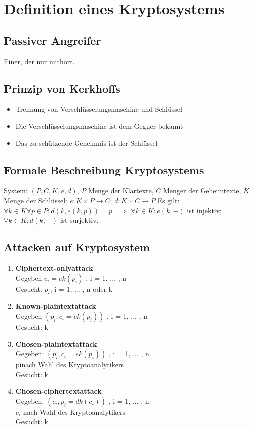 \documentclass[landscape,twocolumn,a4paper]{article}
\begin{document}
\section{Definition eines Kryptosystems}
\subsection{Passiver Angreifer}
Einer, der nur mithört.
\subsection{Prinzip von Kerkhoffs}
\begin{itemize}
	\item Trennung von Verschlüsselungsmaschine und Schlüssel
	\item Die Verschlüsselungsmaschine ist dem Gegner bekannt
	\item Das zu schützende Geheimnis ist der Schlüssel
\end{itemize}
\subsection{Formale Beschreibung Kryptosystems}
System: $(P, C, K, e, d)$, $P$ Menge der Klartexte, $C$ Menger der Geheimtexte, $K$ Menge der Schlüssel:
$e: K \times P \rightarrow C$; $d: K \times C \rightarrow P$
Es gilt: $\forall k \in K \forall p \in P: d (k, e (k, p)) = p$ $\implies$ $\forall k \in K : e(k, -)$ ist injektiv; $\forall k \in K: d(k, -)$ ist surjektiv.
\subsection{Attacken auf Kryptosystem}
\begin{enumerate}
\item \textbf{Ciphertext-onlyattack} \\
Gegeben $c_i= ek(p_i)$ , i = 1, ... , n \\
Gesucht: $p_i$, i = 1, ... , n oder k
\item \textbf{Known-plaintextattack}\\
Gegeben $( p_i, c_i= ek(p_i))$ , i = 1, ... , n \\
Gesucht: k 
\item \textbf{Chosen-plaintextattack}\\
Gegeben: $( p_i, c_i= ek(p_i))$ , i = 1, ... , n \\
pinach Wahl des Kryptoanalytikers \\
Gesucht: k 
\item \textbf{Chosen-ciphertextattack}\\
Gegeben: $( c_i,p_i= dk(c_i))$ , i = 1, ... , n \\
$c_i$ nach Wahl des Kryptoanalytikers \\
Gesucht: k
\end{enumerate}
\end{document}
